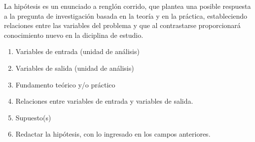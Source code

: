 La hipótesis es un enunciado a renglón corrido, que plantea una posible respuesta a la pregunta de investigación basada en la teoría y en la práctica, estableciendo relaciones entre las variables del problema y que al contrastarse proporcionará conocimiento nuevo en la diciplina de estudio.

\begin{enumerate}
	\item Variables de entrada (unidad de análisis)
	\item Variables de salida (unidad de análisis)
	\item Fundamento teórico y/o práctico
	\item Relaciones entre variables de entrada y variables de salida.
	\item Supuesto(s)
	\item Redactar la hipótesis, con lo ingresado en los campos anteriores.
\end{enumerate}
